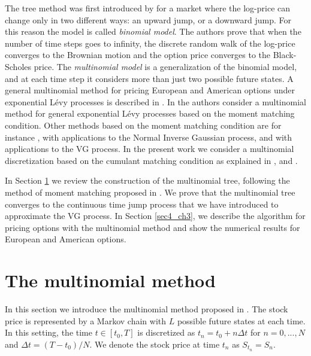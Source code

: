 The tree method was first introduced by \cite{CRR79} for a market where the log-price can change only in two different ways: 
an upward jump, or a downward jump. For this reason the model is called \emph{binomial model}. The authors 
prove that when the number of time steps goes to infinity, the discrete random walk of the log-price converges to the Brownian motion
and the option price converges to the Black-Scholes price.
The \emph{multinomial model} is a generalization of the binomial model, and at each time step it considers 
more than just two possible future states.
A general multinomial method for pricing European and American options under exponential L\'evy processes is described in \cite{MaSoSz}. 
In \cite{KeWe06} the authors consider a multinomial method for general exponential L\'evy processes based on the moment matching condition.
Other methods based on the moment matching condition are for instance \cite{HaMac10}, with applications to the Normal Inverse Gaussian process, and 
\cite{See13} with applications to the VG process.  
In the present work we consider a multinomial discretization based on the cumulant matching condition as explained in \cite{YaPr01}, \cite{YaPr03} and \cite{YaPr06}. 


In Section \ref{sec3_ch3} we review the construction of the multinomial tree, following the method of
moment matching proposed in \cite{YaPr01}. We prove that the multinomial tree converges to the continuous time jump process that we have
introduced to approximate the VG process.
In Section \ref{sec4_ch3}, we describe the algorithm for pricing options with the 
multinomial method and show the numerical results for European and American options.




\section{The multinomial method} \label{sec3_ch3}
In this section we introduce the multinomial method proposed in \cite{YaPr06}. 
The stock price is represented by a Markov chain with $L$ possible future states at each time. 
In this setting, the time $t \in [t_0,T]$ is discretized as $t_n = t_0 + n\Delta t$ for $n=0, ... ,N$ and 
$\Delta t = (T-t_0)/N$. We denote the stock price at time $t_n$ as $S_{t_n} = S_n$.

